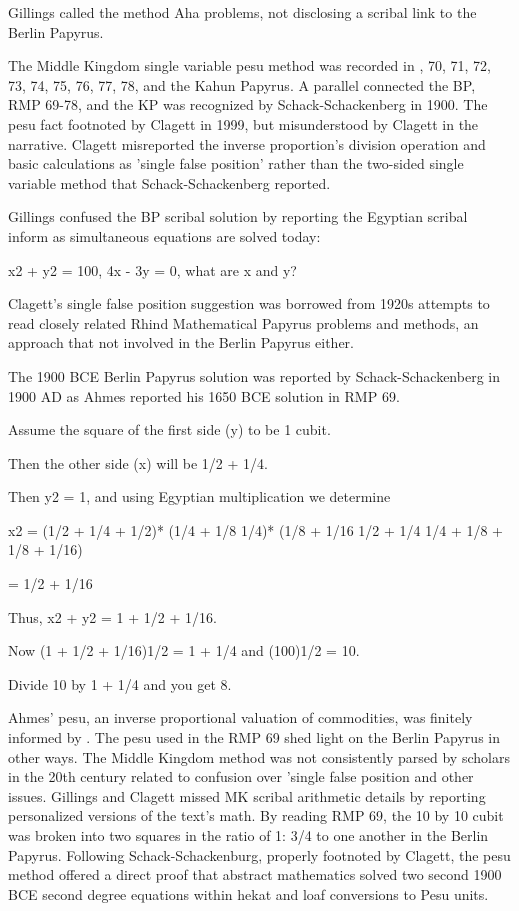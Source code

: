 \documentclass[12pt]{article}
\begin{document}
Gillings called the method Aha problems, not disclosing a scribal link to the Berlin Papyrus. 

The Middle Kingdom single variable pesu method was recorded in , 70, 71, 72, 73, 74, 75, 76, 77, 78,  and the Kahun Papyrus. A parallel connected the BP, RMP 69-78, and the KP was recognized by Schack-Schackenberg in 1900. The pesu fact footnoted by Clagett in 1999, but misunderstood by Clagett in the narrative. Clagett misreported the inverse proportion's division operation and basic calculations as 'single false position' rather than the two-sided single variable method that Schack-Schackenberg reported. 

Gillings confused the BP scribal solution by reporting the Egyptian scribal inform as simultaneous equations are solved today:

   x2 + y2 = 100,   4x - 3y = 0,  what are x and y?

Clagett's single false position suggestion was borrowed from 1920s attempts to read closely related Rhind Mathematical Papyrus problems and methods, an approach that not involved in the Berlin Papyrus either. 

The 1900 BCE Berlin Papyrus solution was reported by Schack-Schackenberg in 1900 AD as Ahmes reported his 1650 BCE solution in RMP 69. 

Assume the square of the first side (y) to be 1 cubit. 

Then the other side (x) will be 1/2 + 1/4. 

Then y2 = 1, and using Egyptian multiplication we determine 

x2 = (1/2 + 1/4 + 1/2)* (1/4 + 1/8 1/4)* (1/8 + 1/16 1/2 + 1/4 1/4 + 1/8 + 1/8 + 1/16) 

= 1/2 + 1/16
 
Thus, x2 + y2 = 1 + 1/2 + 1/16. 

Now (1 + 1/2 + 1/16)1/2 = 1 + 1/4 and (100)1/2 = 10. 

Divide 10 by 1 + 1/4 and you get 8.

Ahmes' pesu, an inverse proportional valuation of commodities, was finitely informed by . The pesu used in the RMP 69 shed light on the Berlin Papyrus in other ways. The Middle Kingdom method was not consistently parsed by scholars in the 20th century related to confusion over 'single false position and other issues. Gillings and Clagett missed MK scribal arithmetic details by reporting personalized versions of the text's math. By reading RMP 69, the 10 by 10 cubit was broken into two squares in the ratio of 1: 3/4 to one another in the Berlin Papyrus. Following Schack-Schackenburg, properly footnoted by Clagett, the pesu method offered a direct proof that abstract mathematics solved two second 1900 BCE second degree equations within hekat and loaf conversions to Pesu units.
\end{document}
